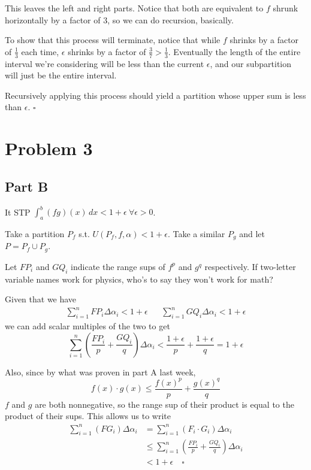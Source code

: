 \documentclass[12pt]{article}
\begin{document}
This leaves the left and right parts.
Notice that both are equivalent to $f$ shrunk horizontally by a factor of $3$, so we can do recursion, basically.

To show that this process will terminate, notice that while $f$ shrinks by a factor of $\frac{1}{3}$ each time,
$\epsilon$ shrinks by a factor of $\frac{3}{7} > \frac{1}{3}$.
Eventually the length of the entire interval we're considering will be less than the current $\epsilon$,
and our subpartition will just be the entire interval.

Recursively applying this process should yield a partition whose upper sum is less than $\epsilon$. $\square$

\pagebreak

\section{Problem 3}

\subsection{Part B}\label{sec:p3pb}

It STP $\int_{a}^{b} (fg)(x)\,dx < 1+\epsilon\ \forall \epsilon > 0$.

Take a partition $P_f$ s.t. $U(P_f, f, \alpha) < 1+\epsilon$.
Take a similar $P_g$ and let $P=P_f \cup P_g$.

Let $FP_i$ and $GQ_i$ indicate the range sups of $f^p$ and $g^q$ respectively.
If two-letter variable names work for physics, who's to say they won't work for math?

Given that we have
\begin{align*}
  \sum_{i=1}^{n} FP_i \Delta \alpha_i < 1+\epsilon &  &
  \sum_{i=1}^{n} GQ_i \Delta \alpha_i < 1+\epsilon
\end{align*}
we can add scalar multiples of the two to get
\[\sum_{i=1}^{n} \left(\frac{FP_i}{p}+\frac{GQ_i}{q}\right)\Delta\alpha_i < \frac{1+\epsilon}{p}+\frac{1+\epsilon}{q}=1+\epsilon\]

Also, since by what was proven in part A last week,
\[f(x) \cdot g(x) \le \frac{f(x)^p}{p}+\frac{g(x)^q}{q}\]
$f$ and $g$ are both nonnegative, so the range sup of their product is
equal to the product of their sups.
This allows us to write
\begin{align*}
  \sum_{i=1}^{n} (FG_i) \Delta\alpha_i
  &=  \sum_{i=1}^{n} (F_i \cdot G_i) \Delta\alpha_i \\
  &\le\sum_{i=1}^{n} \left(\frac{FP_i}{p}+\frac{GQ_i}{q}\right)\Delta\alpha_i  \\
  &< 1+\epsilon\quad\square
\end{align*}
\end{document}
